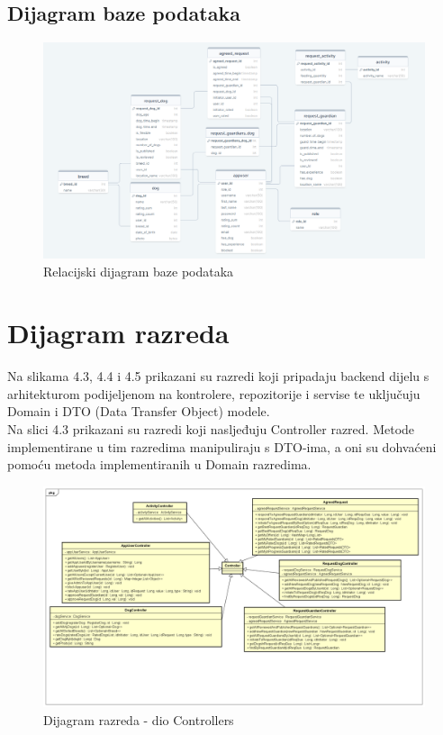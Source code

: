 			\eject
			\subsection{Dijagram baze podataka}
			
			\begin{figure}[htb]
				\centering
				\includegraphics[width=15cm]{slike/drawsql REL}
				\caption{Relacijski dijagram baze podataka} 
				\label{fig:RelDiagram}
			\end{figure}
			
			\eject
			
			
		\section{Dijagram razreda}
		
			Na slikama 4.3, 4.4 i 4.5 prikazani su razredi koji pripadaju backend dijelu s arhitekturom podijeljenom na kontrolere, repozitorije i servise te uključuju Domain i DTO (Data Transfer Object) modele.\\
			Na slici 4.3 prikazani su razredi koji nasljeđuju Controller razred. Metode implementirane u tim razredima manipuliraju s DTO-ima, a oni su dohvaćeni pomoću metoda implementiranih u Domain razredima.
			
			\begin{figure}[htb]
				\centering
				\includegraphics[width=15cm]{slike/Dijagram razreda - Controllers}
				\caption{Dijagram razreda - dio Controllers} 
				\label{fig:Class-Diagram}
			\end{figure}
		
